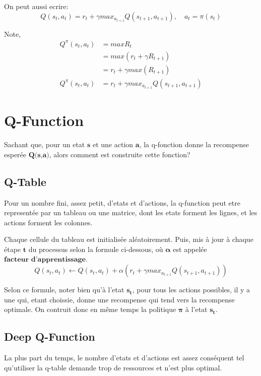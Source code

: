 \documentclass{article}
\begin{document}
On peut aussi ecrire:
$$Q(s_t,a_t)=r_t+{\gamma}max_{a_{t+1}}{Q(s_{t+1},a_{t+1})}, \quad a_t=\pi(s_t)$$

Note,
\begin{equation}
\begin{split}
Q^{\pi}(s_t,a_t)&=maxR_t \\
&=max(r_t+{\gamma}R_{t+1}) \\
&=r_t+{\gamma}max(R_{t+1}) \\
Q^{\pi}(s_t,a_t)&=r_t+{\gamma}max_{a_{t+1}}{Q(s_{t+1},a_{t+1})}
\end{split}
\end{equation}

\section{Q-Function}

Sachant que, pour un etat $\textbf{s}$ et une action $\textbf{a}$, la q-fonction donne la recompense esperée $\textbf{Q(s,a)}$, alors comment est construite cette fonction? 

\subsection{Q-Table}

Pour un nombre fini, assez petit, d'etats et d'actions, la q-function peut etre representée par un tableau ou une matrice, dont les etats forment les lignes, et les actions forment les colonnes.
\newline

Chaque cellule du tableau est initialisée aléatoirement. Puis, mis à jour à chaque étape $\textbf{t}$ du processus selon la formule ci-dessous, où $\boldsymbol{\alpha}$ est appelée $\textbf{facteur d'apprentissage}$.
$$Q(s_t,a_t) \leftarrow Q(s_t,a_t) + \alpha (r_t+{\gamma}max_{a_{t+1}}{Q(s_{t+1},a_{t+1})})$$

Selon ce formule, noter bien qu'à l'etat $\boldsymbol{s_t}$, pour tous les actions possibles, il y a une qui, etant choissie, donne une recompense qui tend vers la recompense optimale. On contruit donc en même temps la politique $\boldsymbol{\pi}$ à l'etat $\boldsymbol{s_t}$.

\newpage

\subsection{Deep Q-Function}

La plus part du temps, le nombre d'etats et d'actions est assez conséquent tel qu'utiliser la q-table demande trop de ressources et n'est plus optimal.
\newline
\end{document}
